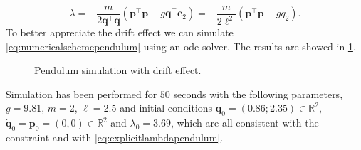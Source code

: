 		\begin{equation}
			\label{eq:explicitlambdapendulum}
			\lambda = -\frac{m}{2\bm{q}^{\intercal}\bm{q}}\left(\bm{p}^{\intercal}\bm{p}-g\bm{q}^{\intercal}\bm{e}_{2}\right) = -\frac{m}{2\ell^{2}}\left(\bm{p}^{\intercal}\bm{p}-gq_{2}\right). 
		\end{equation}
		To better appreciate the drift effect we can simulate \cref{eq:numericalschemependulum} using an ode solver. The results are showed in \cref{fig:trackingerrosr}.
		\begin{figure}[htbp]
			\centering
			\caption{Pendulum simulation with drift effect.}
			\label{fig:trackingerrosr}
		\end{figure}
		Simulation has been performed for $50$ seconds with the following parameters, $g = 9.81$, $m=2$, $\ell=2.5$ and initial conditions $\bm{q}_{0} = (0.86; 2.35)\in\mathbb{R}^{2}$, $\dot{\bm{q}}_{0} = \bm{p}_{0} = (0,0)\in\mathbb{R}^{2}$ and $\lambda_{0} = 3.69$, which are all consistent with the constraint and with \cref{eq:explicitlambdapendulum}.
		
